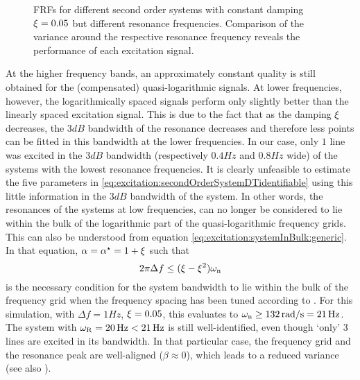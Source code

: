   \begin{figure}%
    \centering
      \setlength{}
      \setlength\figureheight{0.68\figurewidth}
    
    \caption[Simulated \glspl{FRF} and their variances of systems with $\damping=0.05$ for different excitation signals.]{\Glspl{FRF} for different second order systems with constant damping $\damping=0.05$ but different resonance frequencies. 
    Comparison of the variance around the respective resonance frequency reveals the performance of each excitation signal.}%
    \label{fig:excitation:damping005}
  \end{figure}

  At the higher frequency bands, an approximately constant quality is still obtained for the (compensated) quasi-logarithmic signals.
  At lower frequencies, however, the logarithmically spaced signals perform only slightly better than the linearly spaced excitation signal.
  This is due to the fact that as the damping $\xi_{}$ decreases, the $3\unit{dB}$ bandwidth of the resonance decreases and therefore less points can be fitted in this bandwidth at the lower frequencies.
  In our case, only $1$ line was excited in the $3 \unit{dB}$ bandwidth (respectively $0.4 \unit{Hz}$ and $0.8\unit{Hz}$ wide) of the systems with the lowest resonance frequencies.
  It is clearly unfeasible to estimate the five parameters in
  \eqref{eq:excitation:secondOrderSystemDTidentifiable} using this little information in the $3\unit{dB}$ bandwidth of the system.
  In other words, the resonances of the systems at low frequencies, can no longer be considered to lie within the bulk of the logarithmic part of the quasi-logarithmic frequency grids.
  This can also be understood from equation \eqref{eq:excitation:systemInBulk:generic}.
  In that equation, $\alpha = \alpha^{\star} = 1 + \xi_{}$ such that
  \begin{equation}
    2 \pi \Delta f \leq (\xi_{} - \xi_{}^2) \omega_{\mathrm{n}}
    \label{eq:excitation:systemInBulk:tuned}
  \end{equation}
  is the necessary condition for the system bandwidth to lie within the bulk of the frequency grid when the frequency spacing has been tuned according to .
  For this simulation, with $\Delta f=1\unit{Hz}$, $\damping=0.05$, this evaluates to $\omega_{\mathrm{n}} \geq 132 \,\mathrm{rad/s} = 21 \,\mathrm{Hz}$.
  The system with $\omega_{\mathrm{R}} = 20 \,\mathrm{Hz} < 21 \,\mathrm{Hz}$ is still well-identified, even though `only' $3$ lines are excited in its bandwidth.
  In that particular case, the frequency grid and the resonance peak are well-aligned ($\beta \approx 0$), which leads to a reduced variance (see also ).

